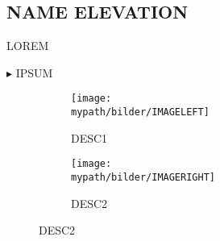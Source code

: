 \subsection{NAME \small{ELEVATION}}
\def \mydate    {Di, 05.01.2016}
\def \mypath    {skitouren/PATHNAME-05.01.2016}
\def \myregion  {Allgäu - Kleinwalsertal}
\def \myparking {ifen.p}
\def \myseason  {Winter 2016}

\def \headersize {0.54}
\def \rating     {$\bigstar~\bigstar~\bigstar~\star$}
\def \ascent     {709}
\def \distance   {6.5}
\def \LLB        {2}
\def \starttime  {12.20}
\def \movingtime {01:41}
\def \overalltime{02:54}
\def \summittime {02:00}
\def \comrades   {-}
\def \difficulty {$L$/1.3/Ex1}
\def \startpoint {\framebox{P} Ifenbahn (3€)}

\def \mapsize{0.5}
\def \mapwrap{16}

\def \myhtx{14}
\def \myhty{-128}

\def \sideimagewith{0.34}
\def \bottomimageleft{0.47}
\def \bottomimageright{0.47}



LOREM


\noindent$\blacktriangleright$
IPSUM

\hfill
\begin{figure}[b!]
\vspace{-3em}
	\begin{subfigure}[b]{\bottomimageleft\textwidth}
		\texttt{[image: \\mypath/bilder/IMAGELEFT]}
		\caption{DESC1}
		\vspace{-1em}
	\end{subfigure}
	\hfill
	\begin{subfigure}[b]{\bottomimageright\textwidth}
		\texttt{[image: \\mypath/bilder/IMAGERIGHT]}
		\caption{DESC2}
		\vspace{-1em}
	\end{subfigure}
\end{figure}
